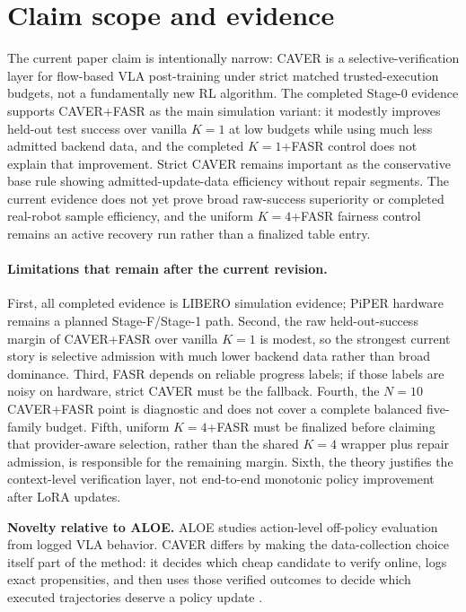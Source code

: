 \documentclass[10pt]{article}
\theoremstyle{plain}
\theoremstyle{definition}
\theoremstyle{remark}
\begin{document}
\section{Claim scope and evidence}
The current paper claim is intentionally narrow: CAVER is a selective-verification layer for flow-based VLA post-training under strict matched trusted-execution budgets, not a fundamentally new RL algorithm. The completed Stage-0 evidence supports CAVER+FASR as the main simulation variant: it modestly improves held-out test success over vanilla $K=1$ at low budgets while using much less admitted backend data, and the completed $K=1$+FASR control does not explain that improvement. Strict CAVER remains important as the conservative base rule showing admitted-update-data efficiency without repair segments. The current evidence does not yet prove broad raw-success superiority or completed real-robot sample efficiency, and the uniform $K=4$+FASR fairness control remains an active recovery run rather than a finalized table entry.

\paragraph{Limitations that remain after the current revision.}
First, all completed evidence is LIBERO simulation evidence; PiPER hardware remains a planned Stage-F/Stage-1 path. Second, the raw held-out-success margin of CAVER+FASR over vanilla $K=1$ is modest, so the strongest current story is selective admission with much lower backend data rather than broad dominance. Third, FASR depends on reliable progress labels; if those labels are noisy on hardware, strict CAVER must be the fallback. Fourth, the $N=10$ CAVER+FASR point is diagnostic and does not cover a complete balanced five-family budget. Fifth, uniform $K=4$+FASR must be finalized before claiming that provider-aware selection, rather than the shared $K=4$ wrapper plus repair admission, is responsible for the remaining margin. Sixth, the theory justifies the context-level verification layer, not end-to-end monotonic policy improvement after LoRA updates.

\textbf{Novelty relative to ALOE.} ALOE studies action-level off-policy evaluation from logged VLA behavior. CAVER differs by making the data-collection choice itself part of the method: it decides which cheap candidate to verify online, logs exact propensities, and then uses those verified outcomes to decide which executed trajectories deserve a policy update \citep{yang2026aloe}.
\end{document}
